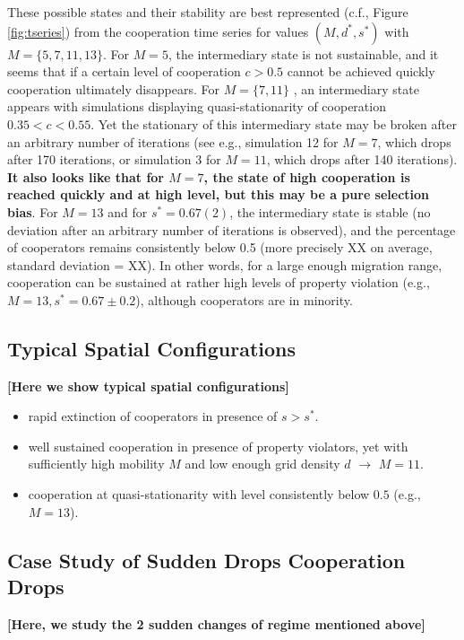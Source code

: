 These possible states and their stability are best represented (c.f., Figure \ref{fig:tseries}) from the cooperation time series for values $(M,d^*,s^*)$ with $M = \{ 5,7,11,13 \}$. For $M=5$, the intermediary state is not sustainable, and it seems that if a certain level of cooperation $c > 0.5$ cannot be achieved quickly cooperation ultimately disappears. For $M = \{7,11\}$ , an intermediary state appears with simulations displaying quasi-stationarity of cooperation $0.35 < c < 0.55$. Yet the stationary of this intermediary state may be broken after an arbitrary number of iterations (see e.g., simulation 12 for $M=7$, which drops after 170 iterations, or simulation 3 for $M=11$, which drops after 140 iterations). {\bf It also looks like that for $M=7$, the state of high cooperation is reached quickly and at high level, but this may be a pure selection bias}. For $M=13$ and for $s^* = 0.67(2)$, the intermediary state is stable (no deviation after an arbitrary number of iterations is observed), and the percentage of cooperators remains consistently below 0.5 (more precisely XX on average, standard deviation = XX). In other words, for a large enough migration range, cooperation can be sustained at rather high levels of property violation (e.g., $M=13, s^* = 0.67\pm0.2$), although cooperators are in minority.\\

\subsection*{Typical Spatial Configurations}

{\bf [Here we show typical spatial configurations]}

\begin{itemize}
  \item rapid extinction of cooperators in presence of $s > s^*$.
  \item well sustained cooperation in presence of property violators, yet with sufficiently high mobility $M$ and low enough grid density $d$ $\rightarrow$ $M=11$.
  \item cooperation at quasi-stationarity with level consistently below $0.5$ (e.g., $M=13$).
\end{itemize}

\subsection*{Case Study of Sudden Drops Cooperation Drops}

{\bf [Here, we study the 2 sudden changes of regime mentioned above] }